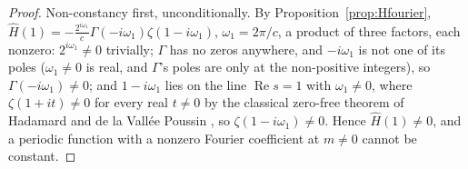 \documentclass[11pt]{amsart}
\theoremstyle{plain}
\theoremstyle{definition}
\theoremstyle{remark}
\begin{document}
\begin{proof}
Non-constancy first, unconditionally. By Proposition~\ref{prop:Hfourier},
$\hat H(1) = -\frac{2^{i\omega_1}}{c}\Gamma(-i\omega_1)\zeta(1-i\omega_1)$, $\omega_1 = 2\pi/c$, a
product of three factors, each nonzero: $2^{i\omega_1}\ne0$ trivially; $\Gamma$ has no zeros
anywhere, and $-i\omega_1$ is not one of its poles ($\omega_1\ne0$ is real, and $\Gamma$'s poles are
only at the non-positive integers), so $\Gamma(-i\omega_1)\ne0$; and $1-i\omega_1$ lies on the line
$\operatorname{Re}s=1$ with $\omega_1\ne0$, where $\zeta(1+it)\ne0$ for every real $t\ne0$ by the
classical zero-free theorem of Hadamard and de la Vall\'ee Poussin \cite{titchmarsh1986}, so
$\zeta(1-i\omega_1)\ne0$. Hence $\hat H(1)\ne0$, and a periodic function with a nonzero Fourier
coefficient at $m\ne0$ cannot be constant.


\end{proof}
\end{document}

